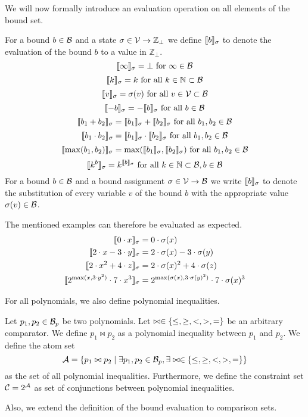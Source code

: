We will now formally introduce an evaluation operation on all elements of the bound set.

\begin{definition}
  For a bound $b \in \mathcal{B}$ and a state $\sigma \in \mathcal{V} \rightarrow \mathbb{Z}_\bot$ we define $\llbracket b \rrbracket_{\sigma}$ to denote the evaluation of the bound $b$ to a value in $\mathbb{Z}_\bot$.
  \[ \llbracket \infty \rrbracket_{\sigma} = \bot \text{ for } \infty \in \mathcal{B} \] 
  \[ \llbracket k \rrbracket_{\sigma} = k \text{ for all } k \in \mathbb{N} \subset \mathcal{B} \] 
  \[ \llbracket v \rrbracket_{\sigma} = \sigma(v) \text{ for all } v \in \mathcal{V} \subset \mathcal{B} \] 
  \[ \llbracket -b \rrbracket_{\sigma} = -\llbracket b \rrbracket_{\sigma} \text{ for all } b \in \mathcal{B} \] 
  \[ \llbracket b_1 + b_2 \rrbracket_{\sigma} = \llbracket b_1 \rrbracket_{\sigma} + \llbracket b_2 \rrbracket_{\sigma} \text{ for all } b_1, b_2 \in \mathcal{B} \] 
  \[ \llbracket b_1 \cdot b_2 \rrbracket_{\sigma} = \llbracket b_1 \rrbracket_{\sigma} \cdot \llbracket b_2 \rrbracket_{\sigma} \text{ for all } b_1, b_2 \in \mathcal{B} \] 
  \[ \llbracket \max(b_1, b_2) \rrbracket_{\sigma} = \max(\llbracket b_1 \rrbracket_{\sigma}, \llbracket b_2 \rrbracket_{\sigma}) \text{ for all } b_1, b_2 \in \mathcal{B} \]
  \[ \llbracket k^b \rrbracket_{\sigma} = k^{\llbracket b \rrbracket_{\sigma}} \text{ for all } k \in \mathbb{N} \subset \mathcal{B}, b \in \mathcal{B} \]  
  For a bound $b \in \mathcal{B}$ and a bound assignment $\sigma \in \mathcal{V} \rightarrow \mathcal{B}$ we write $\llbracket b \rrbracket_{\sigma}$ to denote the substitution of every variable $v$ of the bound $b$ with the appropriate value $\sigma(v) \in \mathcal{B}$.
\end{definition}

The mentioned examples can therefore be evaluated as expected.
\begin{align*}
  \llbracket 0 \cdot x \rrbracket_{\sigma} &= 0 \cdot \sigma(x) \\
  \llbracket 2 \cdot x - 3 \cdot y \rrbracket_{\sigma} &= 2 \cdot \sigma(x) - 3 \cdot \sigma(y) \\
  \llbracket 2 \cdot x^2 + 4 \cdot z \rrbracket_{\sigma} &= 2 \cdot \sigma(x)^2 + 4 \cdot \sigma(z) \\
  \llbracket 2^{\max(x,3 \cdot y^2)} \cdot 7 \cdot x^3 \rrbracket_{\sigma} &= 2^{\max(\sigma(x),3 \cdot \sigma(y)^2)} \cdot 7 \cdot \sigma(x)^3 \\
\end{align*}

For all polynomials, we also define polynomial inequalities.

\begin{definition}
  Let $p_1, p_2 \in \mathcal{B}_p$ be two polynomials.
  Let $\bowtie \in \lbrace \leq, \geq, <, >, = \rbrace$ be an arbitrary comparator.
  We define $p_1 \bowtie p_2$ as a polynomial inequality between $p_1$ and $p_2$.
  We define the atom set
  \[ \mathcal{A} = \lbrace p_1 \bowtie p_2 \mid \exists p_1, p_2 \in \mathcal{B}_p, \exists \bowtie \in \lbrace \leq, \geq, <, >, = \rbrace \rbrace \]
  as the set of all polynomial inequalities.
  Furthermore, we define the constraint set $\mathcal{C} = 2^{\mathcal{A}}$ as set of conjunctions between polynomial inequalities.
\end{definition}
Also, we extend the definition of the bound evaluation to comparison sets.

